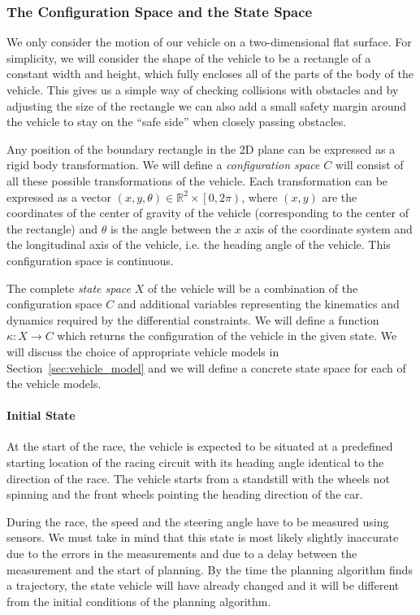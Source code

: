 \subsubsection{The Configuration Space and the State Space}

We only consider the motion of our vehicle on a two-dimensional flat surface. For simplicity, we will consider the shape of the vehicle to be a rectangle of a constant width and height, which fully encloses all of the parts of the body of the vehicle. This gives us a simple way of checking collisions with obstacles and by adjusting the size of the rectangle we can also add a small safety margin around the vehicle to stay on the ``safe side'' when closely passing obstacles.

Any position of the boundary rectangle in the 2D plane can be expressed as a rigid body transformation. We will define a \textit{configuration space} $C$ will consist of all these possible transformations of the vehicle. Each transformation can be expressed as a vector $\left( x, y, \theta\right)\in \mathbb{R}^2\times \left[0, 2\pi\right)$, where $\left( x, y\right)$ are the coordinates of the center of gravity of the vehicle (corresponding to the center of the rectangle) and $\theta$ is the angle between the $x$ axis of the coordinate system and the longitudinal axis of the vehicle, i.e. the heading angle of the vehicle.  This configuration space is continuous.

The complete \textit{state space} $X$ of the vehicle will be a combination of the configuration space $C$ and additional variables representing the kinematics and dynamics required by the differential constraints. We will define a function $\kappa: X\rightarrow C$ which returns the configuration of the vehicle in the given state. We will discuss the choice of appropriate vehicle models in Section~\ref{sec:vehicle_model} and we will define a concrete state space for each of the vehicle models.

\paragraph{Initial State}
At the start of the race, the vehicle is expected to be situated at a predefined starting location of the racing circuit with its heading angle identical to the direction of the race. The vehicle starts from a standstill with the wheels not spinning and the front wheels pointing the heading direction of the car.

During the race, the speed and the steering angle have to be measured using sensors. We must take in mind that this state is most likely slightly inaccurate due to the errors in the measurements and due to a delay between the measurement and the start of planning. By the time the planning algorithm finds a trajectory, the state vehicle will have already changed and it will be different from the initial conditions of the planning algorithm.

